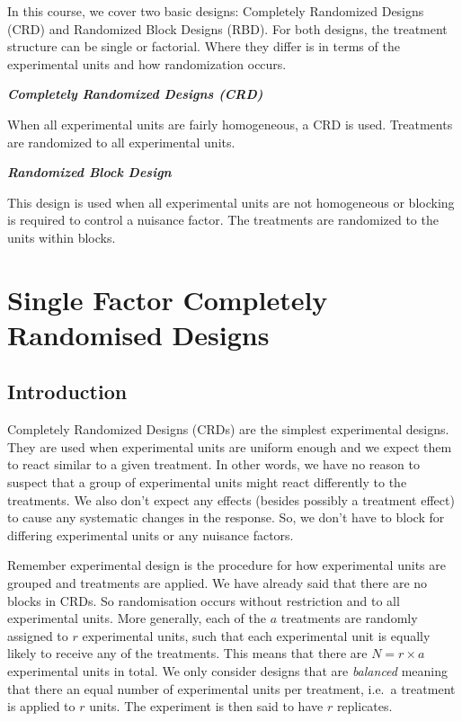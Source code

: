 \documentclass[
  letterpaper,
]{book}
\begin{document}
In this course, we cover two basic designs: Completely Randomized
Designs (CRD) and Randomized Block Designs (RBD). For both designs, the
treatment structure can be single or factorial. Where they differ is in
terms of the experimental units and how randomization occurs.

\textbf{\emph{Completely Randomized Designs (CRD)}}

When all experimental units are fairly homogeneous, a CRD is used.
Treatments are randomized to all experimental units.

\textbf{\emph{Randomized Block Design}}

This design is used when all experimental units are not homogeneous or
blocking is required to control a nuisance factor. The treatments are
randomized to the units within blocks.

\part{Single Factor Completely Randomised Designs}

\chapter{Introduction}\label{introduction}

Completely Randomized Designs (CRDs) are the simplest experimental
designs. They are used when experimental units are uniform enough and we
expect them to react similar to a given treatment. In other words, we
have no reason to suspect that a group of experimental units might react
differently to the treatments. We also don't expect any effects (besides
possibly a treatment effect) to cause any systematic changes in the
response. So, we don't have to block for differing experimental units or
any nuisance factors.

Remember experimental design is the procedure for how experimental units
are grouped and treatments are applied. We have already said that there
are no blocks in CRDs. So randomisation occurs without restriction and
to all experimental units. More generally, each of the \(a\) treatments
are randomly assigned to \(r\) experimental units, such that each
experimental unit is equally likely to receive any of the treatments.
This means that there are \(N = r \times a\) experimental units in
total. We only consider designs that are \emph{balanced} meaning that
there an equal number of experimental units per treatment, i.e.~a
treatment is applied to \(r\) units. The experiment is then said to have
\(r\) replicates.
\end{document}
